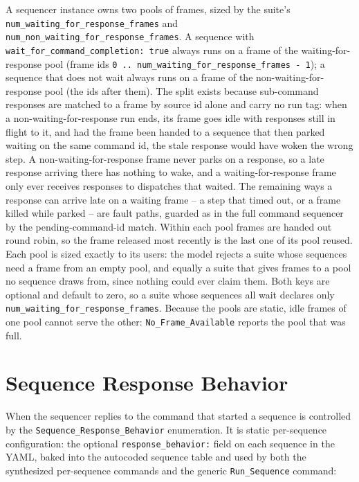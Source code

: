 A sequencer instance owns two pools of frames, sized by the suite's \texttt{num\_waiting\_for\_response\_frames} and \texttt{num\_non\_waiting\_for\_response\_frames}. A sequence with \texttt{wait\_for\_command\_completion: true} always runs on a frame of the waiting-for-response pool (frame ids \texttt{0 .. num\_waiting\_for\_response\_frames - 1}); a sequence that does not wait always runs on a frame of the non-waiting-for-response pool (the ids after them). The split exists because sub-command responses are matched to a frame by source id alone and carry no run tag: when a non-waiting-for-response run ends, its frame goes idle with responses still in flight to it, and had the frame been handed to a sequence that then parked waiting on the same command id, the stale response would have woken the wrong step. A non-waiting-for-response frame never parks on a response, so a late response arriving there has nothing to wake, and a waiting-for-response frame only ever receives responses to dispatches that waited. The remaining ways a response can arrive late on a waiting frame -- a step that timed out, or a frame killed while parked -- are fault paths, guarded as in the full command sequencer by the pending-command-id match. Within each pool frames are handed out round robin, so the frame released most recently is the last one of its pool reused. Each pool is sized exactly to its users: the model rejects a suite whose sequences need a frame from an empty pool, and equally a suite that gives frames to a pool no sequence draws from, since nothing could ever claim them. Both keys are optional and default to zero, so a suite whose sequences all wait declares only \texttt{num\_waiting\_for\_response\_frames}. Because the pools are static, idle frames of one pool cannot serve the other: \texttt{No\_Frame\_Available} reports the pool that was full.

\section{Sequence Response Behavior}

When the sequencer replies to the command that started a sequence is controlled by the \texttt{Sequence\_Response\_Behavior} enumeration. It is static per-sequence configuration: the optional \texttt{response\_behavior:} field on each sequence in the YAML, baked into the autocoded sequence table and used by both the synthesized per-sequence commands and the generic \texttt{Run\_Sequence} command:

